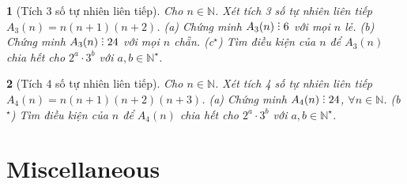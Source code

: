 \documentclass{article}
\newtheorem{baitoan}{}
\DeclareRobustCommand{\divby}{%
	\mathrel{\vbox{\baselineskip.65ex\lineskiplimit0pt\hbox{.}\hbox{.}\hbox{.}}}%
}
\begin{document}
\begin{baitoan}[Tích 3 số tự nhiên liên tiếp]
	Cho $n\in\mathbb{N}$. Xét tích 3 số tự nhiên liên tiếp $A_3(n) = n(n + 1)(n + 2)$. (a) Chứng minh $A_3(n)\divby6$ với mọi $n$ lẻ. (b) Chứng minh $A_3(n)\divby24$ với mọi $n$ chẵn. (c${}^\star$) Tìm điều kiện của $n$ để $A_3(n)$ chia hết cho $2^a\cdot3^b$ với $a,b\in\mathbb{N}^\star$.
\end{baitoan}

\begin{baitoan}[Tích 4 số tự nhiên liên tiếp]
	Cho $n\in\mathbb{N}$. Xét tích 4 số tự nhiên liên tiếp $A_4(n) = n(n + 1)(n + 2)(n + 3)$. (a) Chứng minh $A_4(n)\divby24$, $\forall n\in\mathbb{N}$. (b${}^\star$) Tìm điều kiện của $n$ để $A_4(n)$ chia hết cho $2^a\cdot3^b$ với $a,b\in\mathbb{N}^\star$.
\end{baitoan}


\section{Miscellaneous}


\printbibliography[heading=bibintoc]
\end{document}
